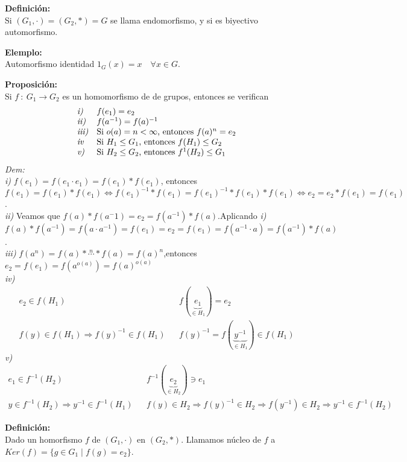 \documentclass{article}
\begin{document}
\textbf{Definición:}\\
Si $(G_1,\cdot)=(G_2,*)=G$ se llama endomorfismo, y si es biyectivo automorfismo.


\textbf{Elemplo:}\\
Automorfismo identidad $1_G(x)=x \quad \forall x\in G$.


\textbf{Proposición:}\\
Si  $f\::\:G_1\longrightarrow G_2$ es un homomorfismo de de grupos, entonces se verifican\\
$$
\begin{array}{ll}
\text{\textit{i)}} & \text{$f(e_1)=e_2$}\\
\text{\textit{ii)}} & \text{$f(a^{-1})=f(a)^{-1}$}\\
\text{\textit{iii)}} & \text{Si $o(a)=n<\infty$, entonces $f(a)^n=e_2$}\\
\text{\textit{iv}} & \text{Si $H_1\le G_1$, entonces $f(H_1)\le G_2$}\\
\text{\textit{v)}} & \text{Si $H_2\le G_2$, entonces $f^1(H_2)\le G_1$}\\
\end{array}
$$
\textit{Dem:}\\
\textit{i)} $f(e_1)=f(e_1\cdot e_1)=f(e_1)*f(e_1)$,  entonces $f(e_1)=f(e_1)*f(e_1) \Leftrightarrow f(e_1)^{-1} * f(e_1)= f(e_1)^{-1}*f(e_1)*f(e_1) \Leftrightarrow e_2=e_2*f(e_1)=f(e_1)$.\\ \textit{ii)} Veamos que $f(a)*f(a^-1)=e_2=f(a^{-1})*f(a)$.Aplicando \textit{i)} $f(a)*f(a^{-1})=f(a\cdot a^{-1})=f(e_1)=e_2=f(e_1)=f(a^{-1}\cdot a)=f(a^{-1})*f(a)$.\\
\textit{iii)} $f(a^n)=f(a)*\overset{n}{\cdots}*f(a)=f(a)^n$,entonces $e_2=f(e_1)=f(a^{o(a)})=f(a)^{o(a)}$\\
\textit{iv)}
$$
\begin{array}{rcl}
e_2\in f(H_1) && f(\underbrace{e_1}_{\in H_1})=e_2 \\
f(y)\in f(H_1)\Rightarrow f(y)^{-1}\in f(H_1) && f(y)^{-1}=f(\underbrace{y^{-1}}_{\in H_1})\in f(H_1)
\end{array}
$$
\textit{v)}
$$
\begin{array}{rcl}
e_1\in f^{-1}(H_2) && f^{-1}(\underbrace{e_2}_{\in H_2})\ni e_1 \\
y\in f^{-1}(H_2)\Rightarrow y^{-1}\in f^{-1}(H_1) && f(y)\in H_2 \Rightarrow f(y)^{-1}\in H_2\Rightarrow f(y^{-1})\in H_2 \Rightarrow y^{-1}\in f^{-1}(H_2)
\end{array}
$$

\textbf{Definición:}\\
Dado un homorfismo $f$ de $(G_1,\cdot)$ en $(G_2,*)$. Llamamos núcleo de $f$ a $Ker(f)=\{ g\in G_1 \mid f(g)=e_2 \}$.
\end{document}
